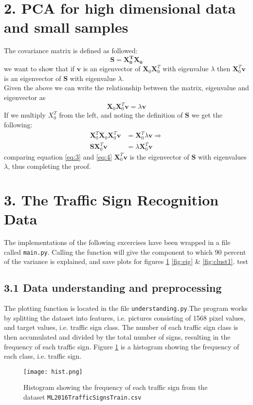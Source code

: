 \documentclass{article}
\begin{document}
\section{2. PCA for high dimensional data and small
samples}
The covariance matrix is defined as followed:
\begin{equation}
\mathbf{S} = \mathbf{X_0^T} \mathbf{X_0}
\end{equation}
we want to show that if $\mathbf{v}$ is an eigenvector of $ \mathbf{X}_0 \mathbf{X}_0^T$ with eigenvalue $\lambda$ then $\mathbf{X}_0^T\mathbf{v}$ is an eigenvector of $\mathbf{S}$ with eigenvalue $\lambda$. \\
Given the above we can write the relationship between the matrix, eigenvalue and eigenvector as
\begin{equation}
\mathbf{X}_0 \mathbf{X}_0^T \mathbf{v} = \lambda \mathbf{v}
\label{eq:3}
\end{equation}
If we multiply $X_0^T$ from the left, and noting the definition of $\mathbf{S}$ we get the following:
\begin{align}
\mathbf{X}_0^T \mathbf{X}_0 \mathbf{X}_0^T \mathbf{v} &= \mathbf{X}_0^T \lambda \mathbf{v} \Rightarrow \\
\mathbf{S} \mathbf{X}_0^T \mathbf{v} &= \lambda \mathbf{X}_0^T  \mathbf{v}
\label{eq:4}
\end{align}
comparing equation \ref{eq:3} and \ref{eq:4} $\mathbf{X}_0^T \mathbf{v}$ is the eigenvector of $\textbf{S}$ with eigenvalues $\lambda$, thus completing the proof.
\section{3. The Traffic Sign Recognition Data}
The implementations of the following excercises have been wrapped in a file called \texttt{main.py}. Calling the function will give the component to which 90 percent of the variance is explained, and save plots for figures \ref{fig:hist} \ref{fig:eig} \& \ref{fig:clust1}.
test
\subsection{3.1 Data understanding and preprocessing}
The plotting function is located in the file \texttt{understanding.py}.The program works by splitting the dataset into features, i.e. pictures consisting of 1568 pixel values, and target values, i.e. traffic sign class. The number of each traffic sign class is then accumulated and divided by the total number of signs, resulting in the frequency of each traffic sign. Figure \ref{fig:hist} is a histogram showing the frequency of each class, i.e. traffic sign.
\begin{figure}[H]
  \centering
  \texttt{[image: hist.png]}
  \caption{Histogram showing the frequency of each traffic sign from the dataset \texttt{ML2016TrafficSignsTrain.csv}}
  \label{fig:hist}
\end{figure}
\end{document}
